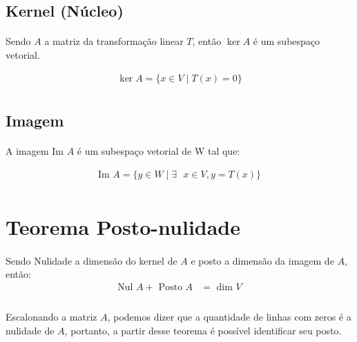 \documentclass{article}
\begin{document}
        \subsection{Kernel (Núcleo)}
            \paragraph{}
            Sendo $A$ a matriz da transformação linear $T$, então $\ker A$ é um subespaço vetorial.

            \begin{align*}
                \ker A = \{x \in V \mid T(x) = 0\}\\
            \end{align*}

        \subsection{Imagem}
            \paragraph{}
            A  imagem Im $A$ é um subespaço vetorial de W tal que: 

            \begin{align*}
                \text{Im } A = \{ y \in W \mid \exists\text{ } x \in V, y = T(x) \}\\
            \end{align*}

    \section{Teorema Posto-nulidade}
        \paragraph{}
        Sendo Nulidade a dimensão do kernel de $A$ e posto a dimensão da imagem de $A$, então:
        \begin{align*}
            \text{Nul } A + \text{ Posto } A &= \text{ dim } V\\
        \end{align*}

        \paragraph{}
        Escalonando a matriz $A$, podemos dizer que a quantidade de linhas com zeros é a nulidade de $A$, portanto, a partir desse
        teorema é possível identificar seu posto.
\end{document}
